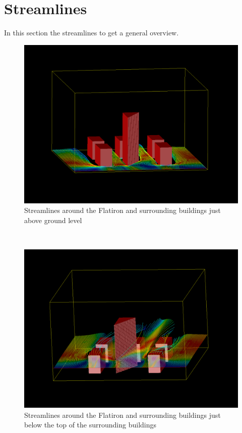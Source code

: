 \section{Streamlines}
\label{sec:streamlines}
In this section the streamlines to get a general overview. \\
\begin{figure}[hp]
\centering
\includegraphics[width =  \textwidth]{streamlinesbottom.png}
\caption{Streamlines around the Flatiron and surrounding buildings just above ground level}
\label{fig:streamlinesbottom}
\end{figure}\\
\begin{figure}[hp]
\centering
\includegraphics[width = \textwidth]{streamlinesmid.png}
\caption{Streamlines around the Flatiron and surrounding buildings just below the top of the surrounding buildings}
\label{fig:streamlinesmid}
\end{figure}\\
